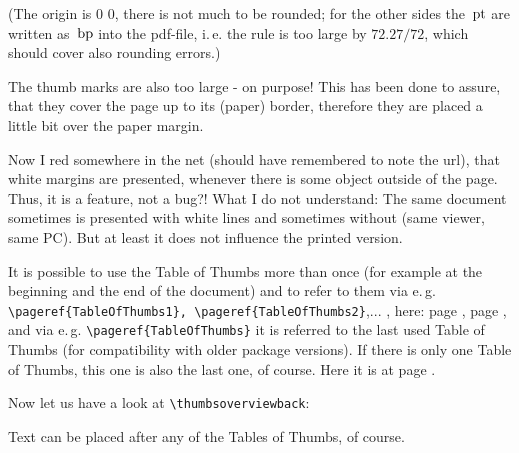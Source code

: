 \documentclass[twoside,british]{article}[2007/10/19]%
\gdef\unit#1{\mathord{\thinspace\mathrm{#1}}}
\begin{document}
(The origin is 0 0, there is not much to be rounded;
for the other sides the $\unit{pt}$ are written as $\unit{bp}$ into
the pdf-file, i.\,e. the rule is too large by $72.27/72$, which
should cover also rounding errors.)

The thumb marks are also too large - on purpose! This has been done
to assure, that they cover the page up to its (paper) border,
therefore they are placed a little bit over the paper margin.

Now I red somewhere in the net (should have remembered to note the url),
that white margins are presented, whenever there is some object outside
of the page. Thus, it is a feature, not a bug?!
What I do not understand: The same document sometimes is presented
with white lines and sometimes without (same viewer, same PC).\newline
But at least it does not influence the printed version.

\newpage

\pagecolor{white}

It is possible to use the Table of Thumbs more than once (for example
at the beginning and the end of the document) and to refer to them via e.\,g.
\verb|\pageref{TableOfThumbs1}, \pageref{TableOfThumbs2}|,... ,
here: page \pageref{TableOfThumbs1}, page \pageref{TableOfThumbs2},
and via e.\,g. \verb|\pageref{TableOfThumbs}| it is referred to the last used
Table of Thumbs (for compatibility with older package versions).
If there is only one Table of Thumbs, this one is also the last one, of course.
Here it is at page \pageref{TableOfThumbs}.\newline

Now let us have a look at \verb|\thumbsoverviewback|:

%

\newpage

Text can be placed after any of the Tables of Thumbs, of course.
\end{document}
